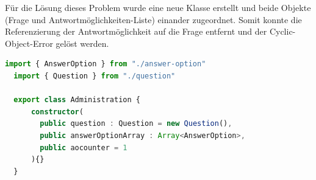 \newline
Für die Lösung dieses Problem wurde eine neue Klasse erstellt und beide Objekte (Frage und Antwortmöglichkeiten-Liste) 
einander zugeordnet. Somit konnte die Referenzierung der Antwortmöglichkeit auf die Frage entfernt und der 
Cyclic-Object-Error gelöst werden.
\begin{lstlisting}[language=TypeScript, caption=Klassen ohne Cyclic-Error, label=lst:neue Klassen ohne cycle-error]
  import { AnswerOption } from "./answer-option"
  import { Question } from "./question"
  
  export class Administration {
      constructor(
        public question : Question = new Question(), 
        public answerOptionArray : Array<AnswerOption>, 
        public aocounter = 1
      ){}
  }  
\end{lstlisting}